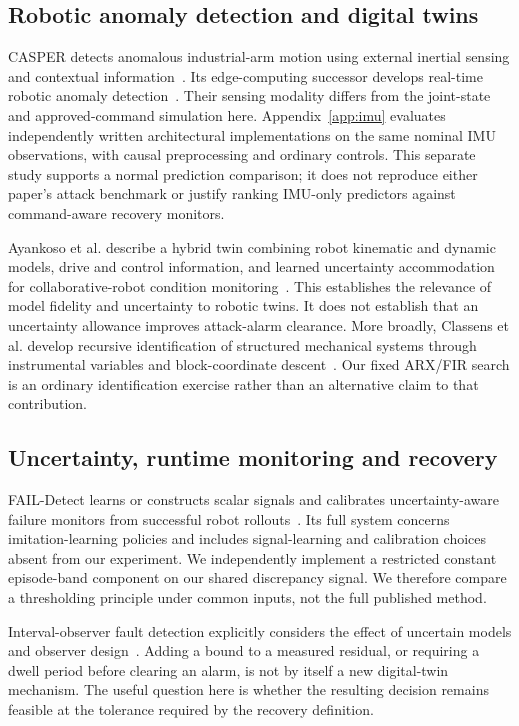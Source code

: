 \documentclass[11pt]{article}
\begin{document}
\subsection{Robotic anomaly detection and digital twins}
CASPER detects anomalous industrial-arm motion using external inertial sensing and contextual information~\cite{casper}. Its edge-computing successor develops real-time robotic anomaly detection~\cite{edge}. Their sensing modality differs from the joint-state and approved-command simulation here. Appendix~\ref{app:imu} evaluates independently written architectural implementations on the same nominal IMU observations, with causal preprocessing and ordinary controls. This separate study supports a normal prediction comparison; it does not reproduce either paper's attack benchmark or justify ranking IMU-only predictors against command-aware recovery monitors.

Ayankoso et al. describe a hybrid twin combining robot kinematic and dynamic models, drive and control information, and learned uncertainty accommodation for collaborative-robot condition monitoring~\cite{hybrid}. This establishes the relevance of model fidelity and uncertainty to robotic twins. It does not establish that an uncertainty allowance improves attack-alarm clearance. More broadly, Classens et al. develop recursive identification of structured mechanical systems through instrumental variables and block-coordinate descent~\cite{identification}. Our fixed ARX/FIR search is an ordinary identification exercise rather than an alternative claim to that contribution.

\subsection{Uncertainty, runtime monitoring and recovery}
FAIL-Detect learns or constructs scalar signals and calibrates uncertainty-aware failure monitors from successful robot rollouts~\cite{fail}. Its full system concerns imitation-learning policies and includes signal-learning and calibration choices absent from our experiment. We independently implement a restricted constant episode-band component on our shared discrepancy signal. We therefore compare a thresholding principle under common inputs, not the full published method.

Interval-observer fault detection explicitly considers the effect of uncertain models and observer design~\cite{interval}. Adding a bound to a measured residual, or requiring a dwell period before clearing an alarm, is not by itself a new digital-twin mechanism. The useful question here is whether the resulting decision remains feasible at the tolerance required by the recovery definition.
\end{document}

